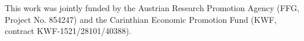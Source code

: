 This work was jointly funded by the Austrian Research Promotion Agency (FFG, Project No. 854247) and the Carinthian Economic Promotion Fund (KWF, contract KWF-1521/28101/40388).
